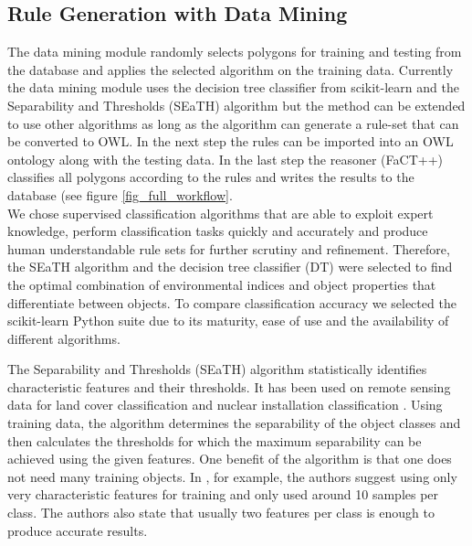 \documentclass[authoryear, review,12pt,number]{elsarticle}
\begin{document}
\subsection{Rule Generation with Data Mining}
The data mining module randomly selects polygons for training and testing from
the database and applies the selected algorithm on the training data. 
%
Currently the data mining module uses the decision tree classifier from
scikit-learn \citep{scikit-learn} and the Separability and Thresholds (SEaTH)
algorithm \citep{Nussbaum2006} but the method can be extended to use other
algorithms as long as the algorithm can generate a rule-set that can be
converted to OWL. In the next step the rules can be imported into an OWL
ontology along with the testing data. In the last step the reasoner (FaCT++)
classifies all polygons according to the rules and writes the results to the
database (see figure \ref{fig_full_workflow}.
\\
We chose supervised classification algorithms that
are able to exploit expert knowledge, perform classification tasks quickly and
accurately and produce human understandable rule sets for further scrutiny and
refinement. Therefore, the SEaTH algorithm and the decision tree classifier
(DT) were selected to find the optimal combination of environmental indices and
object properties that differentiate between objects. To compare classification
accuracy we selected the scikit-learn Python suite \citep{scikit-learn} due to
its maturity, ease of use and the availability of different algorithms. 

The Separability and Thresholds (SEaTH) algorithm \citep{Nussbaum2006}
statistically identifies characteristic features and their thresholds. It has
been used on remote sensing data for land cover classification \citep{Gao2011}
and nuclear installation classification \citep{Nussbaum2006}. Using training
data, the algorithm determines the separability of the object classes and then
calculates the thresholds for which the maximum separability can be achieved
using the given features. One benefit of the algorithm is that one does not
need many training objects. In \cite{Nussbaum2006}, for example, the authors
suggest using only very characteristic features for training and only used
around 10 samples per class. The authors also state that usually two features
per class is enough to produce accurate results.\\
\end{document}
